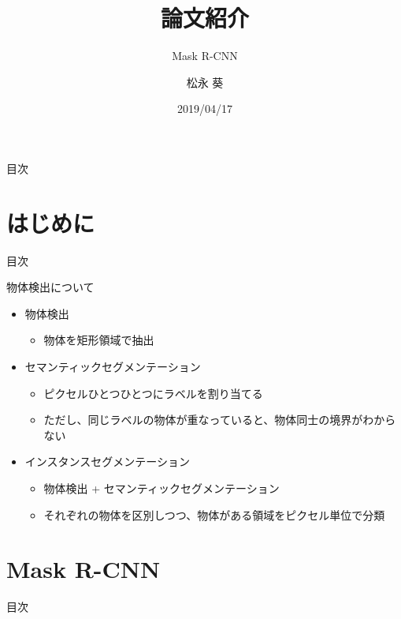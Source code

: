 \documentclass[aspectratio=169, dvipdfmx, 11pt]{beamer}
\title{論文紹介}
\subtitle{Mask R-CNN}
\author{松永 葵}
\institute{谷口研究室 B4}
\date{2019/04/17}
\begin{document}
\maketitle

\begin{frame}{目次}
    \tableofcontents
\end{frame}

\section{はじめに}
\begin{frame}{目次}
    \tableofcontents[currentsection]
\end{frame}

\begin{frame}{物体検出について}
	\begin{itemize}
    	\item 物体検出
        \begin{itemize}
        	\item 物体を矩形領域で抽出 \\
        \end{itemize}
        \item セマンティックセグメンテーション \\
        \begin{itemize}
        	\item ピクセルひとつひとつにラベルを割り当てる \\
            \item ただし、同じラベルの物体が重なっていると、物体同士の境界がわからない \\
        \end{itemize}
        \item インスタンスセグメンテーション \\
        \begin{itemize}
        	\item 物体検出 + セマンティックセグメンテーション \\
			\item それぞれの物体を区別しつつ、物体がある領域をピクセル単位で分類
        \end{itemize}
    \end{itemize}
\end{frame}


\section{Mask R-CNN}
\begin{frame}{目次}
    \tableofcontents[currentsection]
\end{frame}
\end{document}
